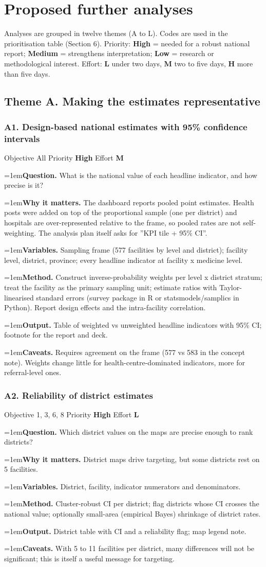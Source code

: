 \documentclass[10pt,a4paper]{article}
\newcommand{\field}[2]{\par\hangindent=1em\textbf{#1.} #2}
\begin{document}
\section{Proposed further analyses}
Analyses are grouped in twelve themes (A to L). Codes are used in the prioritisation table (Section 6). Priority: \textbf{High} = needed for a robust national report; \textbf{Medium} = strengthens interpretation; \textbf{Low} = research or methodological interest. Effort: \textbf{L} under two days, \textbf{M} two to five days, \textbf{H} more than five days.

\subsection{Theme A. Making the estimates representative}
\subsubsection*{A1. Design-based national estimates with 95\% confidence intervals}
{\footnotesize\color{gray} Objective All \textperiodcentered{} Priority \textbf{High} \textperiodcentered{} Effort \textbf{M}}
\field{Question}{What is the national value of each headline indicator, and how precise is it?}
\field{Why it matters}{The dashboard reports pooled point estimates. Health posts were added on top of the proportional sample (one per district) and hospitals are over-represented relative to the frame, so pooled rates are not self-weighting. The analysis plan itself asks for ''KPI tile + 95\% CI''.}
\field{Variables}{Sampling frame (577 facilities by level and district); facility level, district, province; every headline indicator at facility x medicine level.}
\field{Method}{Construct inverse-probability weights per level x district stratum; treat the facility as the primary sampling unit; estimate ratios with Taylor-linearised standard errors (survey package in R or statsmodels/samplics in Python). Report design effects and the intra-facility correlation.}
\field{Output}{Table of weighted vs unweighted headline indicators with 95\% CI; footnote for the report and deck.}
\field{Caveats}{Requires agreement on the frame (577 vs 583 in the concept note). Weights change little for health-centre-dominated indicators, more for referral-level ones.}
\subsubsection*{A2. Reliability of district estimates}
{\footnotesize\color{gray} Objective 1, 3, 6, 8 \textperiodcentered{} Priority \textbf{High} \textperiodcentered{} Effort \textbf{L}}
\field{Question}{Which district values on the maps are precise enough to rank districts?}
\field{Why it matters}{District maps drive targeting, but some districts rest on 5 facilities.}
\field{Variables}{District, facility, indicator numerators and denominators.}
\field{Method}{Cluster-robust CI per district; flag districts whose CI crosses the national value; optionally small-area (empirical Bayes) shrinkage of district rates.}
\field{Output}{District table with CI and a reliability flag; map legend note.}
\field{Caveats}{With 5 to 11 facilities per district, many differences will not be significant; this is itself a useful message for targeting.}
\end{document}
